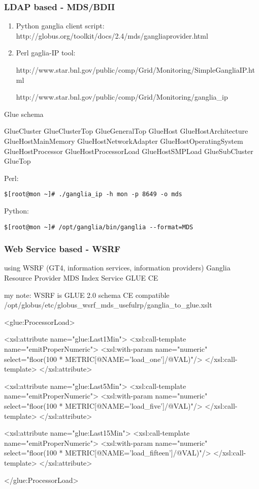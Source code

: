 \subsubsection{LDAP based - MDS/BDII}
\begin{enumerate}
  \item Python ganglia client script:
  http://globus.org/toolkit/docs/2.4/mds/gangliaprovider.html
  \item Perl gaglia-IP tool:
  
  http://www.star.bnl.gov/public/comp/Grid/Monitoring/SimpleGangliaIP.html
  
  http://www.star.bnl.gov/public/comp/Grid/Monitoring/ganglia\_ip

\end{enumerate}

Glue schema

GlueCluster
GlueClusterTop
GlueGeneralTop
GlueHost
GlueHostArchitecture
GlueHostMainMemory
GlueHostNetworkAdapter
GlueHostOperatingSystem
GlueHostProcessor
GlueHostProcessorLoad
GlueHostSMPLoad
GlueSubCluster
GlueTop

Perl:
\begin{lstlisting}
$[root@mon ~]# ./ganglia_ip -h mon -p 8649 -o mds
\end{lstlisting}

Python:
\begin{lstlisting}
$[root@mon ~]# /opt/ganglia/bin/ganglia --format=MDS
\end{lstlisting}


\subsubsection{Web Service based - WSRF}
using WSRF (GT4, information services, information providers)
Ganglia Resource Provider
MDS Index Service
GLUE CE 

my note: WSRF is GLUE 2.0 schema CE compatible
/opt/globus/etc/globus_wsrf_mds_usefulrp/ganglia_to_glue.xslt

<glue:ProcessorLoad>

<xsl:attribute name="glue:Last1Min">
  <xsl:call-template name="emitProperNumeric">
    <xsl:with-param name="numeric" select="floor(100 * METRIC[@NAME='load_one']/@VAL)"/>
  </xsl:call-template>
</xsl:attribute>

<xsl:attribute name="glue:Last5Min">
  <xsl:call-template name="emitProperNumeric">
    <xsl:with-param name="numeric" select="floor(100 * METRIC[@NAME='load_five']/@VAL)"/>
  </xsl:call-template>
</xsl:attribute>

<xsl:attribute name="glue:Last15Min">
  <xsl:call-template name="emitProperNumeric">
    <xsl:with-param name="numeric" select="floor(100 * METRIC[@NAME='load_fifteen']/@VAL)"/>
  </xsl:call-template>
</xsl:attribute>

</glue:ProcessorLoad>
